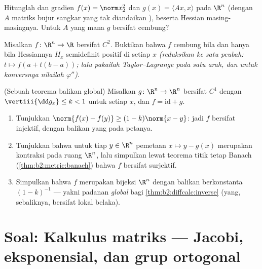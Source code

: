 \begin{exercise}[$\star$]\label{exo:b2:diffcalc:10}
Hitunglah  dan gradien $f(x) = \norm
x_2^2$ dan $g(x) = \langle Ax, x\rangle$ pada $\R^n$ (dengan $A$ matriks
bujur sangkar yang tak diandaikan ), beserta Hessian masing-masingnya.
Untuk $A$ yang mana $g$ bersifat cembung?
\end{exercise}

\begin{exercise}[$\star\star$]\label{exo:b2:diffcalc:11}
Misalkan $f \colon \R^n \to \R$ bersifat $C^2$. Buktikan bahwa $f$ cembung bila
dan hanya bila Hessiannya $H_x$ semidefinit positif di setiap
$x$ \emph{(reduksikan ke satu peubah: $t \mapsto f(a + t(b-a))$;
lalu pakailah Taylor--Lagrange pada satu arah, dan untuk konversnya
nilailah $\varphi''$)}.
\end{exercise}

\begin{exercise}[$\star\star\star$]\label{exo:b2:diffcalc:12}
(Sebuah teorema balikan global) Misalkan $g \colon \R^n \to \R^n$ bersifat $C^1$
dengan $\vertiii{\dd g_x} \leq k < 1$ untuk setiap $x$, dan $f =
\mathrm{id} + g$.
\begin{enumerate}
  \item Tunjukkan $\norm{f(x) - f(y)} \geq (1 - k)\norm{x - y}$: jadi $f$
        bersifat injektif, dengan balikan yang  pada petanya.
  \item Tunjukkan bahwa untuk tiap $y \in \R^n$ pemetaan $x \mapsto y -
        g(x)$ merupakan kontraksi pada ruang  $\R^n$,
        lalu simpulkan lewat teorema titik tetap Banach
        (\cref{thm:b2:metric:banach}) bahwa $f$ bersifat surjektif.
  \item Simpulkan bahwa $f$ merupakan bijeksi $\R^n$ dengan
        balikan  berkonstanta $(1-k)^{-1}$ --- yakni padanan
        \emph{global} bagi \cref{thm:b2:diffcalc:inverse} (yang,
        sebaliknya, bersifat lokal belaka).
\end{enumerate}
\end{exercise}

\section{Soal: Kalkulus matriks --- Jacobi,
eksponensial, dan grup ortogonal}

